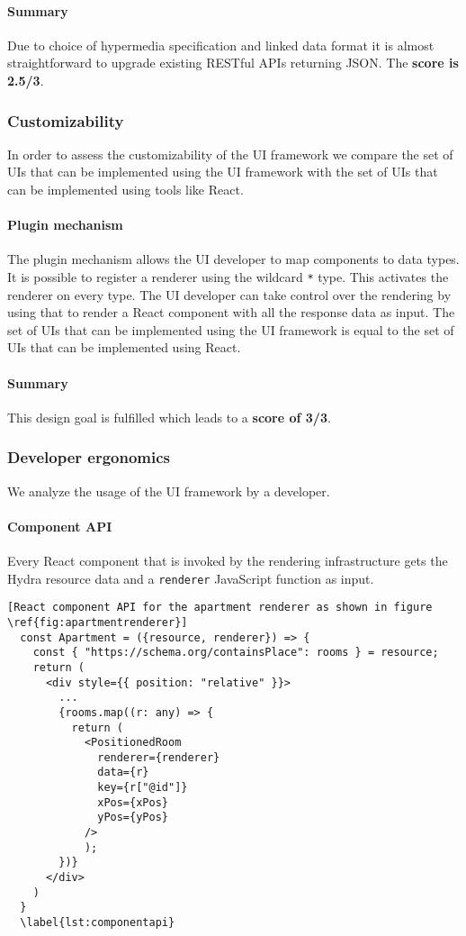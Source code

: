 \paragraph{Summary}
Due to choice of hypermedia specification and linked data format it is almost straightforward to upgrade existing RESTful APIs returning JSON. The \textbf{score is 2.5/3}.

\subsubsection{Customizability}
In order to assess the customizability of the UI framework we compare the set of UIs that can be implemented using the UI framework with the set of UIs that can be implemented using tools like React.

\paragraph{Plugin mechanism}
The plugin mechanism allows the UI developer to map components to data types. It is possible to register a renderer using the wildcard \lstinline{*} type. This activates the renderer on every type. The UI developer can take control over the rendering by using that to render a React component with all the response data as input. The set of UIs that can be implemented using the UI framework is equal to the set of UIs that can be implemented using React.

\paragraph{Summary}
This design goal is fulfilled which leads to a \textbf{score of 3/3}.

\subsubsection{Developer ergonomics}
We analyze the usage of the UI framework by a developer.

\paragraph{Component API}
Every React component that is invoked by the rendering infrastructure gets the Hydra resource data and a \lstinline{renderer} JavaScript function as input.

\lstset{language=JSON}
\begin{lstlisting}[React component API for the apartment renderer as shown in figure \ref{fig:apartmentrenderer}]
  const Apartment = ({resource, renderer}) => {
    const { "https://schema.org/containsPlace": rooms } = resource;
    return (
      <div style={{ position: "relative" }}>
        ...
        {rooms.map((r: any) => {
          return (
            <PositionedRoom
              renderer={renderer}
              data={r}
              key={r["@id"]}
              xPos={xPos}
              yPos={yPos}
            />
            );
        })}
      </div>
    )
  }
  \label{lst:componentapi}
\end{lstlisting}

